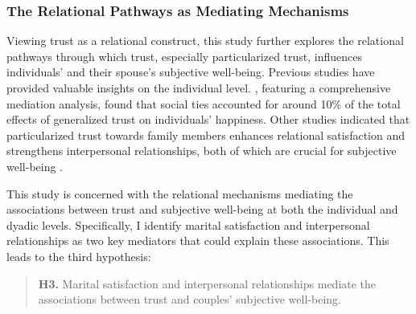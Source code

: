 \subsubsection{The Relational Pathways as Mediating Mechanisms}

Viewing trust as a relational construct, this study further explores the relational pathways through which trust, especially particularized trust, influences individuals' and their spouse's subjective well-being. Previous studies have provided valuable insights on the individual level. \textcite{luLongitudinalEvidenceSocial2019}, featuring a comprehensive mediation analysis, found that social ties accounted for around 10\% of the total effects of generalized trust on individuals' happiness. Other studies indicated that particularized trust towards family members enhances relational satisfaction and strengthens interpersonal relationships, both of which are crucial for subjective well-being \parencite{adilRoleTrustMarital2013,fitzpatrickAttachmentTrustSatisfaction2017,shekMaritalQualityPsychological1995,wongExaminationRelationshipTrust2002}.

This study is concerned with the relational mechanisms mediating the associations between trust and subjective well-being at both the individual and dyadic levels. Specifically, I identify marital satisfaction and interpersonal relationships as two key mediators that could explain these associations. This leads to the third hypothesis:

\begin{quote}
    \textbf{H3.} Marital satisfaction and interpersonal relationships mediate the associations between trust and couples' subjective well-being.
\end{quote}
